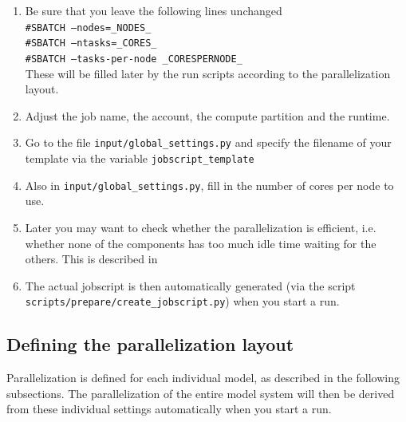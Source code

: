 \documentclass[a4paper,titlepage]{scrartcl}
\begin{document}
\begin{sloppypar}
\begin{enumerate}
\item Be sure that you leave the following lines unchanged \\
\texttt{\#SBATCH --nodes=\_NODES\_}\\
\texttt{\#SBATCH --ntasks=\_CORES\_}\\
\texttt{\#SBATCH --tasks-per-node \_CORESPERNODE\_}\\
These will be filled later by the run scripts according to the parallelization layout.
\item Adjust the job name, the account, the compute partition and the runtime.
\item Go to the file \texttt{input/global\_settings.py} and specify the filename of your template via the variable \texttt{jobscript\_template}
\item Also in \texttt{input/global\_settings.py}, fill in the number of cores per node to use.
\item Later you may want to check whether the parallelization is efficient, i.e. whether none of the components has too much idle time waiting for the others. 
This is described in 
\item The actual jobscript is then automatically generated (via the script \texttt{scripts/prepare/create\_jobscript.py}) when you start a run.
\end{enumerate}
\end{sloppypar}

\subsection{Defining the parallelization layout}
Parallelization is defined for each individual model, as described in the following subsections.
The parallelization of the entire model system will then be derived from these individual settings automatically when you start a run.
\end{document}

